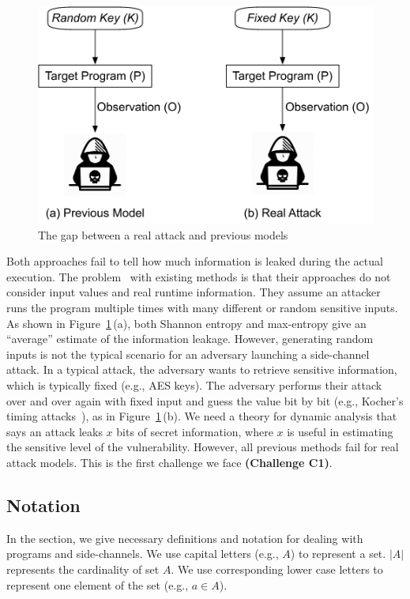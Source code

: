 \begin{figure}[h]
    \vspace*{-5pt}
    \centering
    \includegraphics[width=.65\columnwidth]{./figures/RA.pdf}
\vspace*{-2pt}
    \caption{The gap between a real attack and previous models}\label{fig:gap}
    \vspace*{-5pt}
\end{figure}

Both approaches fail to tell how much information is leaked during the actual execution. 
The problem~\cite{Chattopadhyay:2017:QIL:3127041.3127044} with existing methods is that their approaches do not consider input values and 
real runtime information. 
They assume an attacker runs the program multiple times with many different or 
random sensitive inputs. As
shown in Figure~\ref{fig:gap}\,(a), both Shannon entropy and max-entropy
give an ``average'' estimate of the information leakage. However, generating random inputs is
not the typical scenario for an adversary launching a side-channel attack. In
a typical attack, the adversary wants to retrieve sensitive
information, which is typically fixed (e.g., AES keys).
The adversary performs their attack over and over again with fixed input and 
guess the value bit by
bit (e.g., Kocher's timing attacks~\cite{kocher1996timing}), as in Figure~\ref{fig:gap}\,(b). 
We need a theory for dynamic analysis that says an attack leaks $x$ bits of
secret information, where $x$ is useful in estimating the sensitive level of the vulnerability. 
However, all previous methods fail for real attack models. This is the first challenge we face
\textbf{(Challenge C1)}.

\subsection{Notation}
In the section, we give necessary definitions and notation for dealing with
programs and side-channels. We use capital letters (e.g., $A$) to represent a
set. $|A|$ represents the cardinality of set $A$. We use corresponding lower case
letters to represent one element of the set (e.g., $a \in A$).

